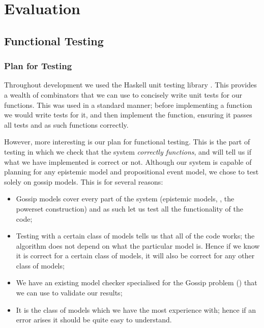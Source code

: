 \documentclass[10pt, a4paper]{report}
\begin{document}
\newpage

\chapter{Evaluation}

\section{Functional Testing}

\subsection{Plan for Testing}

Throughout development we used the Haskell unit testing library . This provides
a wealth of combinators that we can use to concisely write unit tests for our
functions. This was used in a standard manner; before implementing a function we
would write tests for it, and then implement the function, ensuring it passes
all tests and as such functions correctly.

However, more interesting is our plan for functional testing. This is the part
of testing in which we check that the system \emph{correctly functions}, and
will tell us if what we have implemented is correct or not. Although our system
is capable of planning for any epistemic model and propositional event model, we
chose to test solely on gossip models. This is for several reasons:

\begin{itemize}
\setlength\itemsep{1em}
\item Gossip models cover every part of the system (epistemic models, \mestar,
  the powerset construction) and as such let us test all the functionality of
  the code;
\item Testing with a certain class of models tells us that all of the code
  works; the algorithm does not depend on what the particular model is. Hence if
  we know it is correct for a certain class of models, it will also be correct
  for any other class of models;
\item We have an existing model checker specialised for the Gossip problem
  (\cite{GithubGossip}) that we can use to validate our results;
\item It is the class of models which we have the most experience with; hence if
  an error arises it should be quite easy to understand.
\end{itemize}
\end{document}
